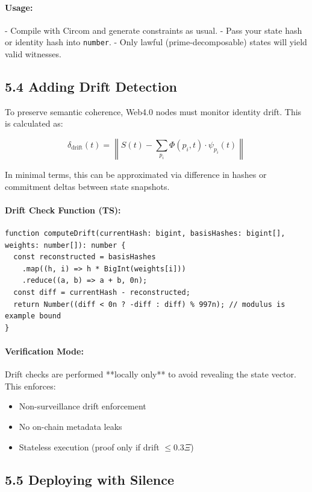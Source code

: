 \documentclass[12]{amsart}
\theoremstyle{plain}
\begin{document}
\paragraph{Usage:}
- Compile with Circom and generate constraints as usual.
- Pass your state hash or identity hash into \texttt{number}.
- Only lawful (prime-decomposable) states will yield valid witnesses.

\subsection{5.4 Adding Drift Detection}
\label{subsec:drift_detection}

To preserve semantic coherence, Web4.0 nodes must monitor identity drift. This is calculated as:

\[
\delta_{\text{drift}}(t) = \left\| S(t) - \sum_{p_i} \Phi(p_i, t) \cdot \psi_{p_i}(t) \right\|
\]

In minimal terms, this can be approximated via difference in hashes or commitment deltas between state snapshots.

\paragraph{Drift Check Function (TS):}
\begin{verbatim}
function computeDrift(currentHash: bigint, basisHashes: bigint[], weights: number[]): number {
  const reconstructed = basisHashes
    .map((h, i) => h * BigInt(weights[i]))
    .reduce((a, b) => a + b, 0n);
  const diff = currentHash - reconstructed;
  return Number((diff < 0n ? -diff : diff) % 997n); // modulus is example bound
}
\end{verbatim}

\paragraph{Verification Mode:}  
Drift checks are performed **locally only** to avoid revealing the state vector. This enforces:
\begin{itemize}
  \item Non-surveillance drift enforcement
  \item No on-chain metadata leaks
  \item Stateless execution (proof only if drift $\leq 0.3 \Xi$)
\end{itemize}

\subsection{5.5 Deploying with Silence}
\label{subsec:deploy_silence}
\end{document}
